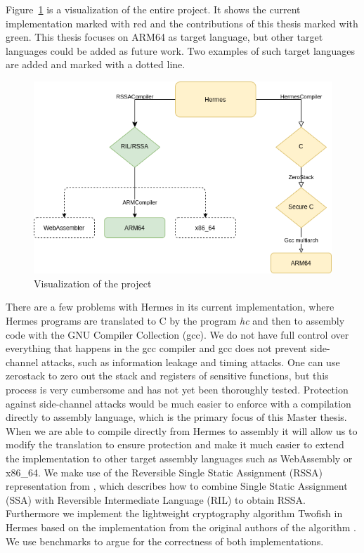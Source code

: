 Figure~\ref{fig:compilationProcess} is a visualization of the entire project. It shows the current implementation marked with red and the contributions of this thesis marked with green. This thesis focuses on ARM64 as target language, but other target languages could be added as future work. Two examples of such target languages are added and marked with a dotted line.
\begin{figure}[tp]
  \centering
  \includegraphics[scale=0.57]{Graphics/compilationProcess.png}
  \caption{Visualization of the project}
  \label{fig:compilationProcess}
\end{figure}

There are a few problems with Hermes in its current implementation, where Hermes programs are translated to C by the program \emph{hc} and then to assembly code with the GNU Compiler Collection (gcc).
We do not have full control over everything that happens in the gcc compiler and gcc does not prevent side-channel attacks, such as information leakage and timing attacks\cite{Simon2018}.
One can use zerostack\cite{Github.zerostack} to zero out the stack and registers of sensitive functions, but this process is very cumbersome and has not yet been thoroughly tested. 
Protection against side-channel attacks would be much easier to enforce with a compilation directly to assembly language, which is the primary focus of this Master thesis.
When we are able to compile directly from Hermes to assembly it will allow us to modify the translation to ensure protection and make it much easier to extend the implementation to other target assembly languages such as WebAssembly or x86\_64.
We make use of the Reversible Single Static Assignment (RSSA) representation from \cite{10.1007/978-3-319-41579-6_16}, which describes how to combine Single Static Assignment (SSA) with Reversible Intermediate Language (RIL) to obtain RSSA.
Furthermore we implement the lightweight cryptography algorithm Twofish in Hermes based on the implementation from the original authors of the algorithm \cite{GIT2F}. We use benchmarks to argue for the correctness of both implementations.




